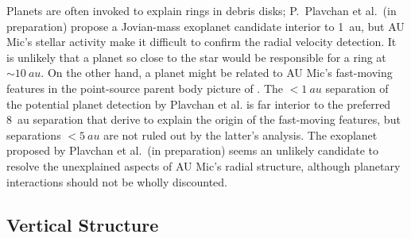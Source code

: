 \documentclass[modern]{aastex62}
\begin{document}
Planets are often invoked to explain rings in debris disks; P.~Plavchan et al.~(in preparation) propose a Jovian-mass exoplanet candidate interior to \SI{1}{au}, but AU Mic's stellar activity make it difficult to confirm the radial velocity detection.
It is unlikely that a planet so close to the star would be responsible for a ring at $\sim\SI{10}{au}$.
On the other hand, a planet
might be related to 
AU Mic's fast-moving features in the point-source parent body picture of \citet{sezestre17}.
The $< \SI{1}{au}$ separation of the potential planet detection by Plavchan et al. is far interior to the preferred \SI{8}{au} separation that \citet{sezestre17} derive to explain the origin of the fast-moving features, but separations $< \SI{5}{au}$ are not ruled out by
the latter's
analysis.
The exoplanet proposed by Plavchan et al.~(in preparation) seems an unlikely candidate to resolve the unexplained aspects of AU Mic's radial structure, although planetary interactions should not be wholly discounted.

\subsection{Vertical Structure}
\label{subsection: vertical discussion}
\end{document}
